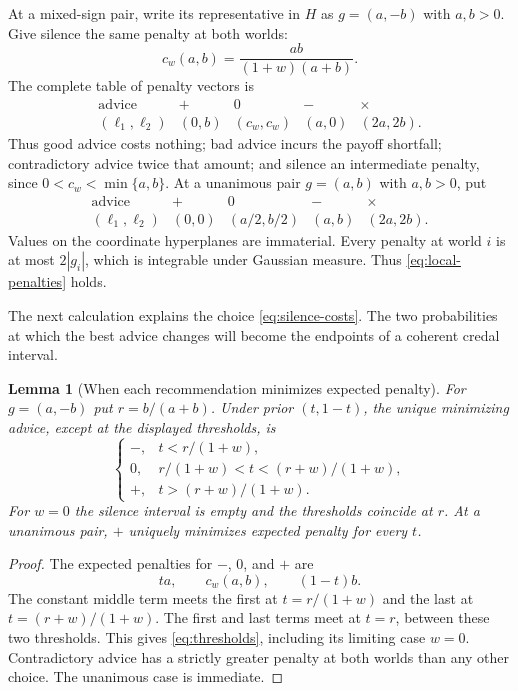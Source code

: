 \documentclass[11pt]{article}
\newtheorem{lemma}[theorem]{Lemma}
\theoremstyle{remark}
\begin{document}
At a mixed-sign pair, write its representative in $H$ as $g=(a,-b)$ with
$a,b>0$. Give silence the same penalty at both worlds:
\begin{equation}
 \boxed{\quad c_w(a,b)=\frac{ab}{(1+w)(a+b)}.\quad}
 \label{eq:silence-costs}
\end{equation}
The complete table of penalty vectors is
\begin{equation}
 \begin{array}{c|cccc}
 \text{advice}&+&0&-&\times\\ \hline
 (\ell_1,\ell_2)&(0,b)&(c_w,c_w)&(a,0)&(2a,2b).
 \end{array}
 \label{eq:mixed-table}
\end{equation}
Thus good advice costs nothing; bad advice incurs the payoff shortfall;
contradictory advice twice that amount; and silence an intermediate penalty,
since $0<c_w<\min\{a,b\}$. At a unanimous pair $g=(a,b)$ with $a,b>0$, put
\begin{equation}
 \begin{array}{c|cccc}
 \text{advice}&+&0&-&\times\\ \hline
 (\ell_1,\ell_2)&(0,0)&(a/2,b/2)&(a,b)&(2a,2b).
 \end{array}
 \label{eq:unanimous-table}
\end{equation}
Values on the coordinate hyperplanes are immaterial.
Every penalty at world $i$ is at most $2|g_i|$, which is integrable under
Gaussian measure. Thus \eqref{eq:local-penalties} holds.

The next calculation explains the choice \eqref{eq:silence-costs}.
The two probabilities at which the best advice changes will become the
endpoints of a coherent credal interval.

\begin{lemma}[When each recommendation minimizes expected penalty]\label{lem:thresholds}
For $g=(a,-b)$ put $r=b/(a+b)$. Under prior $(t,1-t)$, the unique minimizing
advice, except at the displayed thresholds, is
\begin{equation}
 \begin{cases}
 -,&t<r/(1+w),\\
 0,&r/(1+w)<t<(r+w)/(1+w),\\
 +,&t>(r+w)/(1+w).
 \end{cases}\label{eq:thresholds}
\end{equation}
For $w=0$ the silence interval is empty and the thresholds coincide at $r$.
At a unanimous pair, $+$ uniquely minimizes expected penalty for every $t$.
\end{lemma}
\begin{proof}
The expected penalties for $-$, $0$, and $+$ are
\[
 ta,\qquad c_w(a,b),\qquad (1-t)b.
\]
The constant middle term meets the first at $t=r/(1+w)$ and the last at
$t=(r+w)/(1+w)$. The first and last terms meet at $t=r$, between these two
thresholds. This gives \eqref{eq:thresholds}, including its limiting case
$w=0$. Contradictory advice has a strictly greater penalty at both worlds
than any other choice. The unanimous case is immediate.
\end{proof}
\end{document}
